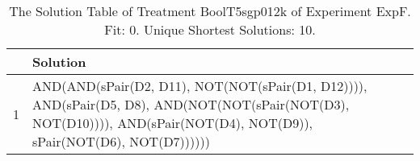 \begin{table}[ht]
\centering
\begin{tabular}{rp{9cm}}
  \hline
 & Solution \\ 
  \hline
1 & AND(AND(sPair(D2, D11), NOT(NOT(sPair(D1, D12)))), AND(sPair(D5, D8), AND(NOT(NOT(sPair(NOT(D3), NOT(D10)))), AND(sPair(NOT(D4), NOT(D9)), sPair(NOT(D6), NOT(D7)))))) \\ 
   \hline
\end{tabular}
\caption{The Solution Table of Treatment BoolT5sgp012k of Experiment ExpF. Fit: 0. Unique Shortest Solutions: 10.} 
\end{table}
